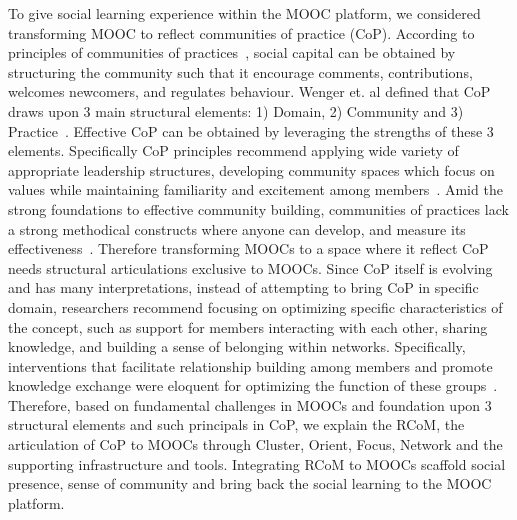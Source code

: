\documentclass[format=acmsmall, review=false, screen=true]{acmart}
\newcommand{\msb}[1]{{\textcolor{blue}{ [Michael: #1]}}}
\begin{document}
To give social learning experience within the MOOC platform, we considered transforming MOOC to reflect communities of practice (CoP). According to principles of communities of practices~\cite{wenger2002seven}, social capital can be obtained by structuring the community such that it encourage comments, contributions, welcomes newcomers, and regulates behaviour. Wenger et. al defined that CoP draws upon 3 main structural elements: 1) Domain, 2) Community and 3) Practice~\cite{wenger2002cultivating}. Effective CoP can be obtained by leveraging the strengths of these 3 elements. Specifically CoP principles recommend applying wide variety of appropriate leadership structures, developing community spaces which focus on values while maintaining familiarity and excitement among members~\cite{wenger2002cultivating}. Amid the strong foundations to effective community building, communities of practices lack a strong methodical constructs where anyone can develop, and measure its effectiveness~\cite{li2009evolution}. Therefore transforming MOOCs to a space where it reflect CoP needs structural articulations exclusive to MOOCs. Since CoP itself is evolving and has many interpretations, instead of attempting to bring CoP in specific domain, researchers recommend focusing on optimizing specific characteristics of the concept, such as support for members interacting with each other, sharing knowledge, and building a sense of belonging within networks. Specifically, interventions that facilitate relationship building among members and promote knowledge exchange were eloquent for optimizing the function of these groups~\cite{li2009evolution}. Therefore, based on fundamental challenges in MOOCs and foundation upon 3 structural elements and such principals in CoP, we explain the RCoM, the articulation of CoP to MOOCs through Cluster, Orient, Focus, Network and the supporting infrastructure and tools. Integrating RCoM to MOOCs scaffold social presence, sense of community and bring back the social learning to the MOOC platform.

\end{document}
